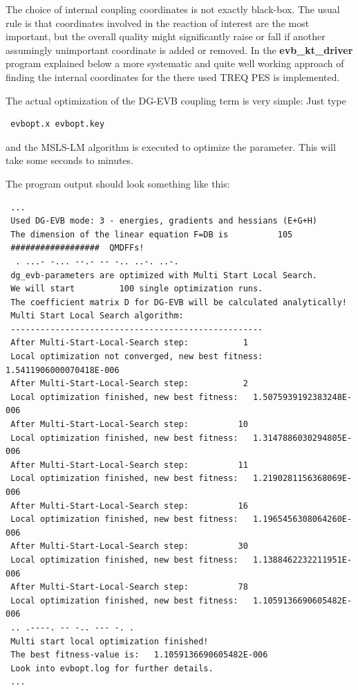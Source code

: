 \documentclass[12pt,a4paper]{scrartcl}
\begin{document}
The choice of internal coupling coordinates is not exactly black-box. The usual rule is that coordinates 
involved in the reaction of interest are the most important, but the overall quality might 
significantly raise or fall if another assumingly unimportant coordinate is added or removed.
In the \textbf{evb\_kt\_driver} program explained below a more systematic and quite well working 
approach of finding 
the internal coordinates for the there used TREQ PES is implemented.

The actual optimization of the DG-EVB coupling term is very simple: Just type 
\begin{verbatim}
 evbopt.x evbopt.key
\end{verbatim}

and the MSLS-LM algorithm is executed to optimize the parameter. This will take some seconds 
to minutes.

The program output should look something like this:

\begin{verbatim}
 ...
 Used DG-EVB mode: 3 - energies, gradients and hessians (E+G+H)
 The dimension of the linear equation F=DB is          105
 ##################  QMDFFs!
  . ...- -... --.- -- -.. ..-. ..-.
 dg_evb-parameters are optimized with Multi Start Local Search.
 We will start         100 single optimization runs.
 The coefficient matrix D for DG-EVB will be calculated analytically!
 Multi Start Local Search algorithm:
 ---------------------------------------------------
 After Multi-Start-Local-Search step:           1
 Local optimization not converged, new best fitness:   1.5411906000070418E-006
 After Multi-Start-Local-Search step:           2
 Local optimization finished, new best fitness:   1.5075939192383248E-006
 After Multi-Start-Local-Search step:          10
 Local optimization finished, new best fitness:   1.3147886030294805E-006
 After Multi-Start-Local-Search step:          11
 Local optimization finished, new best fitness:   1.2190281156368069E-006
 After Multi-Start-Local-Search step:          16
 Local optimization finished, new best fitness:   1.1965456308064260E-006
 After Multi-Start-Local-Search step:          30
 Local optimization finished, new best fitness:   1.1388462232211951E-006
 After Multi-Start-Local-Search step:          78
 Local optimization finished, new best fitness:   1.1059136690605482E-006
 .. .----. -- -.. --- -. . 
 Multi start local optimization finished!
 The best fitness-value is:   1.1059136690605482E-006
 Look into evbopt.log for further details.
 ...
\end{verbatim}
\end{document}
